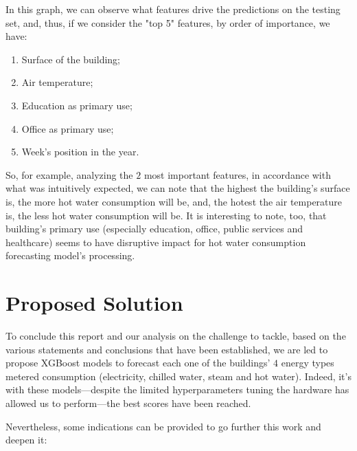 \documentclass[twocolumn, switch]{article}
\begin{document}
In this graph, we can observe what features drive the predictions on the testing set, and, thus, if we consider the "top 5" features, by order of importance, we have:

\begin{enumerate}
\item Surface of the building;
\item Air temperature;
\item Education as primary use;
\item Office as primary use;
\item Week's position in the year.
\end{enumerate}

So, for example, analyzing the $2$ most important features, in accordance with what was intuitively expected, we can note that the highest the building's surface is, the more hot water consumption will be, and, the hotest the air temperature is, the less hot water consumption will be. It is interesting to note, too, that building's primary use (especially education, office, public services and healthcare) seems to have disruptive impact for hot water consumption forecasting model's processing.


\section{Proposed Solution}

To conclude this report and our analysis on the challenge to tackle, based on the various statements and conclusions that have been established, we are led to propose XGBoost models to forecast each one of the buildings' $4$ energy types metered consumption (electricity, chilled water, steam and hot water). Indeed, it's with these models---despite the limited hyperparameters tuning the hardware has allowed us to perform---the best scores have been reached.

Nevertheless, some indications can be provided to go further this work and deepen it:
\end{document}
